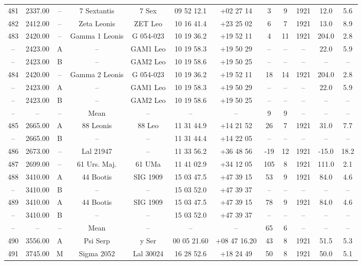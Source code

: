 \begin{table}
\begin{tabular}{cccccccccccc}
481 & 2337.00 & -- & 7 Sextantis & 7 Sex & 09 52 12.1 & +02 27 14 & 3 & 9 & 1921 & 12.0 & 5.6 \\
482 & 2412.00 & -- & Zeta Leonis & ZET Leo & 10 16 41.4 & +23 25 02 & 6 & 7 & 1921 & 13.0 & 8.9 \\
483 & 2420.00 & -- & Gamma 1 Leonis & G 054-023 & 10 19 36.2 & +19 52 11 & 4 & 11 & 1921 & 204.0 & 2.8 \\
-- & 2423.00 & A & -- & GAM1 Leo & 10 19 58.3 & +19 50 29 & -- & -- & -- & 22.0 & 5.9 \\
-- & 2423.00 & B & -- & GAM2 Leo & 10 19 58.6 & +19 50 25 & -- & -- & -- & -- & -- \\
484 & 2420.00 & -- & Gamma 2 Leonis & G 054-023 & 10 19 36.2 & +19 52 11 & 18 & 14 & 1921 & 204.0 & 2.8 \\
-- & 2423.00 & A & -- & GAM1 Leo & 10 19 58.3 & +19 50 29 & -- & -- & -- & 22.0 & 5.9 \\
-- & 2423.00 & B & -- & GAM2 Leo & 10 19 58.6 & +19 50 25 & -- & -- & -- & -- & -- \\
-- & -- & -- & Mean & -- & -- & -- & 9 & 9 & -- & -- & -- \\
485 & 2665.00 & A & 88 Leonis & 88 Leo & 11 31 44.9 & +14 21 52 & 26 & 7 & 1921 & 31.0 & 7.7 \\
-- & 2665.00 & B & -- & -- & 11 31 44.4 & +14 22 05 & -- & -- & -- & -- & -- \\
486 & 2673.00 & -- & Lal 21947 & -- & 11 33 56.2 & +36 48 56 & -19 & 12 & 1921 & -15.0 & 18.2 \\
487 & 2699.00 & -- & 61 Urs. Maj. & 61 UMa & 11 41 02.9 & +34 12 05 & 105 & 8 & 1921 & 111.0 & 2.1 \\
488 & 3410.00 & A & 44 Bootis & SIG 1909 & 15 03 47.5 & +47 39 15 & 53 & 9 & 1921 & 84.0 & 4.6 \\
-- & 3410.00 & B & -- & -- & 15 03 52.0 & +47 39 37 & -- & -- & -- & -- & -- \\
489 & 3410.00 & A & 44 Bootis & SIG 1909 & 15 03 47.5 & +47 39 15 & 78 & 9 & 1921 & 84.0 & 4.6 \\
-- & 3410.00 & B & -- & -- & 15 03 52.0 & +47 39 37 & -- & -- & -- & -- & -- \\
-- & -- & -- & Mean & -- & -- & -- & 65 & 6 & -- & -- & -- \\
490 & 3556.00 & A & Psi Serp & y Ser & 00 05 21.60 & +08 47 16.20 & 43 & 8 & 1921 & 51.5 & 5.3 \\
491 & 3745.00 & M & Sigma 2052 & Lal 30024 & 16 28 52.6 & +18 24 49 & 50 & 8 & 1921 & 50.0 & 5.1 \\

\end{tabular}
\end{table}
